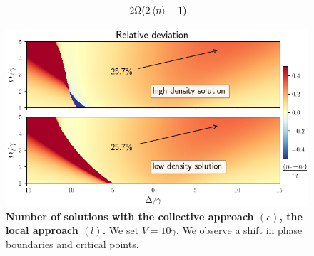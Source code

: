 \documentclass[a0,plainsections]{sciposter}
\begin{document}
\begin{multicols}{2}
\begin{figure}
\begin{minipage}{\textwidth}
\begin{minipage}[c][][t]{0.54\textwidth}
\begin{shaded}
\begin{alignat}{7}
						 &                         &  &    &                          & -2\Omega (2\expval{n} -1)                                                     &  &                                   &  & \nonumber
					\end{alignat}
				\end{shaded}
			\end{minipage}
			\hfill
			\begin{minipage}[c][][t]{0.44\textwidth}
				\captionsetup{type=figure}
				\centering
				\vspace*{-10pt} %
				\includegraphics[width=\textwidth]{./images/DemoPlot.png}
				\vspace*{-60pt} %
				\caption{
					\textbf{Number of solutions with the collective approach $(c)$, the local approach $(l)$.}
					We set $V=10\gamma$. We observe a shift in phase boundaries and critical points.}
				\label{fig:NofSols}
			\end{minipage}
		\end{minipage}
	\end{figure}


\end{multicols}
\end{document}
